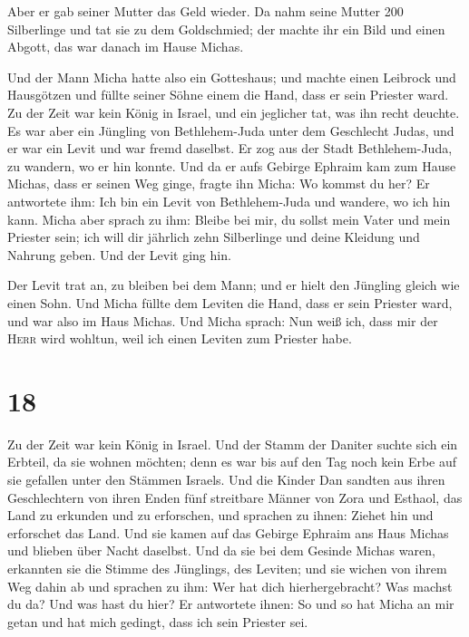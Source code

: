  Aber er gab seiner Mutter das Geld wieder. Da nahm seine
Mutter 200 Silberlinge und tat sie zu dem Goldschmied; der machte ihr
ein Bild und einen Abgott, das war danach im Hause Michas.

 Und der Mann Micha hatte also ein Gotteshaus; und machte
einen Leibrock und Hausgötzen und füllte seiner Söhne einem die Hand,
dass er sein Priester ward.  Zu der Zeit war kein König in
Israel, und ein jeglicher tat, was ihn recht deuchte.  Es
war aber ein Jüngling von Bethlehem-Juda unter dem Geschlecht Judas, und
er war ein Levit und war fremd daselbst.  Er zog aus der
Stadt Bethlehem-Juda, zu wandern, wo er hin konnte. Und da er aufs
Gebirge Ephraim kam zum Hause Michas, dass er seinen Weg ginge,
 fragte ihn Micha: Wo kommst du her? Er antwortete ihm:
Ich bin ein Levit von Bethlehem-Juda und wandere, wo ich hin kann.
 Micha aber sprach zu ihm: Bleibe bei mir, du sollst mein
Vater und mein Priester sein; ich will dir jährlich zehn Silberlinge und
deine Kleidung und Nahrung geben. Und der Levit ging hin.

 Der Levit trat an, zu bleiben bei dem Mann; und er hielt
den Jüngling gleich wie einen Sohn.  Und Micha füllte dem
Leviten die Hand, dass er sein Priester ward, und war also im Haus
Michas.  Und Micha sprach: Nun weiß ich, dass mir der
\textsc{Herr} wird wohltun, weil ich einen Leviten zum Priester habe.

\hypertarget{section-17}{%
\section{18}\label{section-17}}

 Zu der Zeit war kein König in Israel. Und der Stamm der
Daniter suchte sich ein Erbteil, da sie wohnen möchten; denn es war bis
auf den Tag noch kein Erbe auf sie gefallen unter den Stämmen Israels.
 Und die Kinder Dan sandten aus ihren Geschlechtern von
ihren Enden fünf streitbare Männer von Zora und Esthaol, das Land zu
erkunden und zu erforschen, und sprachen zu ihnen: Ziehet hin und
erforschet das Land. Und sie kamen auf das Gebirge Ephraim ans Haus
Michas und blieben über Nacht daselbst.  Und da sie bei
dem Gesinde Michas waren, erkannten sie die Stimme des Jünglings, des
Leviten; und sie wichen von ihrem Weg dahin ab und sprachen zu ihm: Wer
hat dich hierhergebracht? Was machst du da? Und was hast du hier?
 Er antwortete ihnen: So und so hat Micha an mir getan und
hat mich gedingt, dass ich sein Priester sei.

